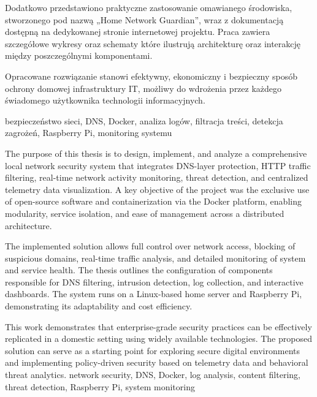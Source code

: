 \documentclass[
    left=2.5cm,         %
    right=2.5cm,        %
    top=2.5cm,          %
    bottom=3cm,         %
    bindingoffset=6mm,  %
    nohyphenation=true %
]{eiti/eiti-thesis} %
\begin{document}
Dodatkowo przedstawiono praktyczne zastosowanie omawianego środowiska, stworzonego pod nazwą „Home Network Guardian”\cite{github-homenetguardian}, wraz z dokumentacją dostępną na dedykowanej stronie internetowej projektu. Praca zawiera szczegółowe wykresy oraz schematy które ilustrują architekturę oraz interakcję między poszczególnymi komponentami.

Opracowane rozwiązanie stanowi efektywny, ekonomiczny i bezpieczny sposób ochrony domowej infrastruktury IT, możliwy do wdrożenia przez każdego świadomego użytkownika technologii informacyjnych.

\slowakluczowe bezpieczeństwo sieci, DNS, Docker, analiza logów, filtracja treści, detekcja zagrożeń, Raspberry Pi, monitoring systemu

\newpage

\abstract The purpose of this thesis is to design, implement, and analyze a comprehensive local network security system that integrates DNS-layer protection, HTTP traffic filtering, real-time network activity monitoring, threat detection, and centralized telemetry data visualization. A key objective of the project was the exclusive use of open-source software and containerization via the Docker platform, enabling modularity, service isolation, and ease of management across a distributed architecture.

The implemented solution allows full control over network access, blocking of suspicious domains, real-time traffic analysis, and detailed monitoring of system and service health. The thesis outlines the configuration of components responsible for DNS filtering, intrusion detection, log collection, and interactive dashboards. The system runs on a Linux-based home server and Raspberry Pi, demonstrating its adaptability and cost efficiency.

This work demonstrates that enterprise-grade security practices can be effectively replicated in a domestic setting using widely available technologies. The proposed solution can serve as a starting point for exploring secure digital environments and implementing policy-driven security based on telemetry data and behavioral threat analytics.
\keywords network security, DNS, Docker, log analysis, content filtering, threat detection, Raspberry Pi, system monitoring
\newpage

\end{document}
